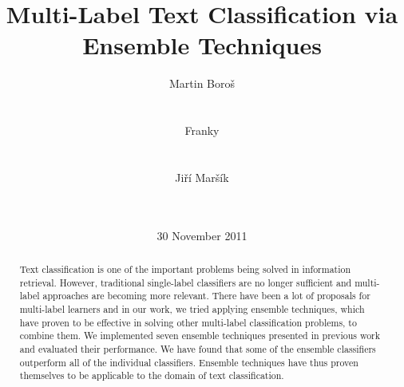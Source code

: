 \documentclass{acm_proc_article-sp}
\begin{document}
\title{Multi-Label Text Classification via Ensemble Techniques}

\author{
\alignauthor
Martin Boro\v{s}\\
       \\
       \\
\alignauthor
Franky\\
       \\
       \\
\alignauthor
Ji\v{r}\'{i} Mar\v{s}\'{i}k\\
       \\
       \\
       }

\date{30 November 2011}

\maketitle
\begin{abstract}
Text classification is one of the important problems being solved in
information retrieval. However, traditional single-label classifiers
are no longer sufficient and multi-label approaches are becoming more
relevant. There have been a lot of proposals for multi-label learners
and in our work, we tried applying ensemble techniques, which have
proven to be effective in solving other multi-label classification
problems, to combine them. We implemented seven ensemble techniques
presented in previous work and evaluated their performance. We have
found that some of the ensemble classifiers outperform all of the
individual classifiers. Ensemble techniques have thus proven
themselves to be applicable to the domain of text classification.
\end{abstract}













\balancecolumns
\end{document}
